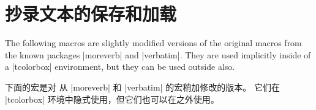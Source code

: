 \setcounter{section}{6}
\setcounter{subsection}{2}
\setcounter{subsubsection}{0}
 
\section{抄录文本的保存和加载}%
%

The following macros are slightly modified versions of the original macros
from the known packages |moreverb| and |verbatim|.
They are used implicitly inside of a |tcolorbox| environment,
but they can be used outside also.

下面的宏是对 从 |moreverb| 和 |verbatim| 的宏稍加修改的版本。%
它们在 |tcolorbox| 环境中隐式使用，但它们也可以在之外使用。



